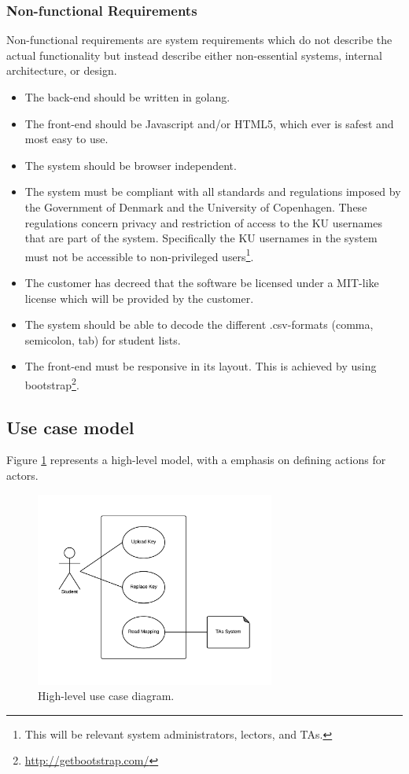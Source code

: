 \documentclass[11pt,a4paper]{report}
\begin{document}
\subsubsection{Non-functional Requirements}\label{subsubsec:Non_Functional_Req}
Non-functional requirements are system requirements which do not describe the actual functionality but instead describe either non-essential systems, internal architecture, or design.
\begin{itemize}
\item The back-end should be written in golang.
\item The front-end should be Javascript and/or HTML5, which ever is safest and most easy to use.
\item The system should be browser independent.
\item The system must be compliant with all standards and regulations imposed by the Government of Denmark and the University of Copenhagen. These regulations concern privacy and restriction of access to the KU usernames that are part of the system. Specifically the KU usernames in the system must not be accessible to non-privileged users\footnote{This will be relevant system administrators, lectors, and TAs.}.
\item The customer has decreed that the software be licensed under a MIT-like license which will be provided by the customer.
\item The system should be able to decode the different .csv-formats (comma, semicolon, tab) for student lists.
\item The front-end must be responsive in its layout. This is achieved by using bootstrap\footnote{\href{http://getbootstrap.com/}{http://getbootstrap.com/}}.
\end{itemize}

\subsection{Use case model}\label{subsec:Use_case_model}

Figure \ref{fig:use_case_diagram_high_level} represents a high-level model, with a emphasis on defining actions for actors.


\begin{figure}[H]
    \centering
    \includegraphics[width=0.7\textwidth]{pictures/use_case_pksu_del2_b_high}
    \caption{High-level use case diagram.}
    \label{fig:use_case_diagram_high_level}
\end{figure}
\end{document}
